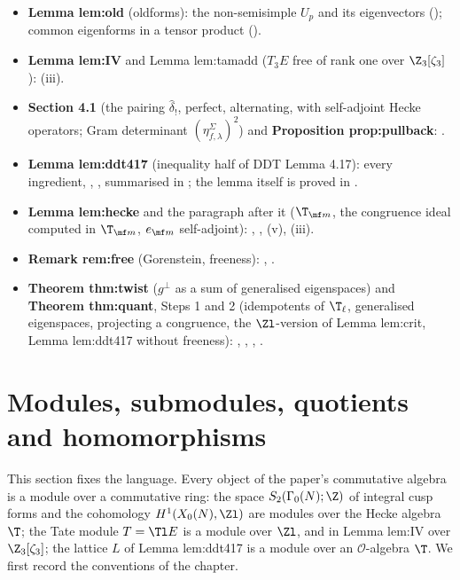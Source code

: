 \begin{itemize}
\item \textbf{Lemma lem:old} (oldforms): the non-semisimple $U_p$ and its eigenvectors (); common eigenforms in a tensor product
().
\item \textbf{Lemma lem:IV} and Lemma lem:tamadd ($T_3E$ free of rank one over $\Z_3[\zeta_3]$): (iii).
\item \textbf{Section 4.1} (the pairing $\hat\delta_!$, perfect, alternating, with self-adjoint Hecke operators; Gram determinant $(\eta^\Sigma_{f,\lambda})^2$) and \textbf{Proposition
prop:pullback}: .
\item \textbf{Lemma lem:ddt417} (inequality half of DDT Lemma 4.17): every ingredient, ,
, summarised in ; the lemma itself is proved in .
\item \textbf{Lemma lem:hecke} and the paragraph after it ($\T_{\mf m}$, the congruence ideal computed in $\T_{\mf m}$, $e_{\mf m}$ self-adjoint): ,
, (v), (iii).
\item \textbf{Remark rem:free} (Gorenstein, freeness): , .
\item \textbf{Theorem thm:twist} ($g^\perp$ as a sum of generalised eigenspaces) and \textbf{Theorem thm:quant}, Steps 1 and 2 (idempotents of $\T_\ell$, generalised
eigenspaces, projecting a congruence, the $\Zl$-version of Lemma lem:crit, Lemma lem:ddt417 without freeness): ,
, , .
\end{itemize}

\section{Modules, submodules, quotients and homomorphisms}\label{sec:modules:modules}

This section fixes the language. Every object of the paper's commutative algebra is a module over a commutative
ring: the space $S_2(\Gamma_0(N);\Z)$ of integral cusp forms and the cohomology $H^1(X_0(N),\Zl)$ are modules over the
Hecke algebra $\T$; the Tate module $T=\Tl E$ is a module over $\Zl$, and in Lemma lem:IV over $\Z_3[\zeta_3]$; the
lattice $L$ of Lemma lem:ddt417 is a module over an $\mathcal O$-algebra $\T$. We first record the conventions of the chapter.

